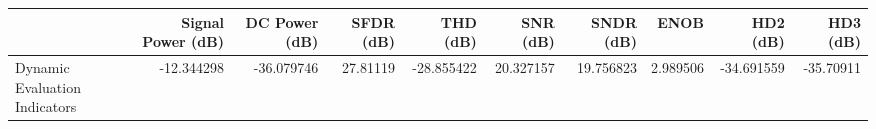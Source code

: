 \begin{tabular}{lrrrrrrrrr}
\toprule
{} &  Signal Power (dB) &  DC Power (dB) &  SFDR (dB) &   THD (dB) &   SNR (dB) &  SNDR (dB) &      ENOB &   HD2 (dB) &  HD3 (dB) \\
\midrule
Dynamic Evaluation Indicators &         -12.344298 &     -36.079746 &   27.81119 & -28.855422 &  20.327157 &  19.756823 &  2.989506 & -34.691559 & -35.70911 \\
\bottomrule
\end{tabular}
